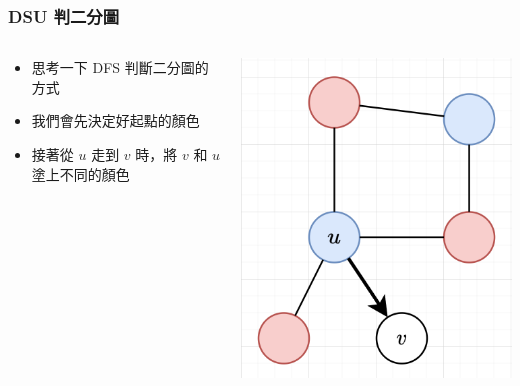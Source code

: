 \documentclass[aspectratio=169]{beamer}
\begin{document}
    \begin{frame}
        \frametitle{DSU 判二分圖}
        \begin{columns}
            \begin{column}{0.6 \textwidth}
                \begin{itemize}
                    \item 思考一下 DFS 判斷二分圖的方式
                    \item 我們會先決定好起點的顏色
                    \item 接著從 $u$ 走到 $v$ 時，將 $v$ 和 $u$ 塗上不同的顏色
                \end{itemize}
            \end{column}
            \begin{column}{0.4 \textwidth}
                \begin{center}
                    \includegraphics[scale=0.4]{images/bipartite.png}
                \end{center}
            \end{column}
        \end{columns}
    \end{frame}
    
\end{document}
